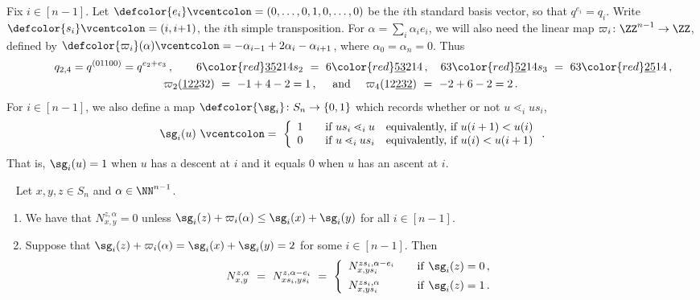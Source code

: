 Fix $i\in[n{-}1]$.
Let $\defcolor{e_i}\vcentcolon=(0,\dotsc,0,1,0,\dotsc,0)$ be the $i$th standard basis vector, so that $q^{e_i}=q_i$.
Write $\defcolor{s_i}\vcentcolon=(i,i{+}1)$, the $i$th simple transposition.
For $\alpha=\sum_i \alpha_ie_i$, we will also need the linear map $\varpi_i\colon\ZZ^{n-1}\to\ZZ$, defined by
$\defcolor{\varpi_i}(\alpha)\vcentcolon=-\alpha_{i-1}+2\alpha_i-\alpha_{i+1}$, where $\alpha_0=\alpha_n=0$.   
Thus
 \begin{multline*}
   \qquad  q_{2,4}=q^{(01100)}=q^{e_2+e_3}\,,   \qquad
   6{\color{red}\underline{35}}214 s_2\ =\ 6{\color{red}\underline{53}}214\,,\quad
   63{\color{red}\underline{52}}14 s_3\ =\ 63{\color{red}\underline{25}}14\,, \\
   \varpi_2(\underline{122}32)\ =\ -1+4-2=1\,,\quad \mbox{ and }\quad  \varpi_4(12\underline{232})\ =\ -2+6-2=2\,.\qquad 
 \end{multline*}
 For $i\in[n{-}1]$, we also define a map $\defcolor{\sg_i}\colon S_n\to\{0,1\}$ which records whether or not $u\lessdot_i
 us_i$, 
 \[
    \sg_i(u)\ \vcentcolon=\ \left\{ \begin{array}{rcl}
       1& &\mbox{if\ } u s_i\lessdot_i  u     \quad\mbox{equivalently, if\ } u(i+1)<u(i)
      \\
       0& &\mbox{if\ } u    \lessdot_i  u s_i \quad\mbox{equivalently, if\ } u(i)<u(i+1)
    \end{array}\right. .
 \]                 
 That is, $\sg_i(u)=1$ when $u$ has a descent at $i$ and it equals $0$ when $u$ has an ascent at $i$. 
  
\begin{proposition}~\cite[Theorem 1.1]{LeungLi2012}\label{P:LL_Th1.1}
  Let $x,y,z\in S_n$ and $\alpha\in\NN^{n-1}$. 
  \begin{enumerate}
    \item We have that $N^{z, \alpha}_{x,y}=0$ unless
           $\sg_i(z)+\varpi_i(\alpha) \leq \sg_i(x)+\sg_i(y)$ for all $i\in[n{-}1]$.\vspace{2pt}
           
    \item Suppose that   $\sg_i(z)+\varpi_i(\alpha) = \sg_i(x)+\sg_i(y)=2$ for some $i\in[n{-}1]$. Then
  \[
           N^{z,\alpha}_{x,y}\ =\ N^{z,\alpha-e_i}_{x s_i, y s_i}\ =\ \left\{ \begin{array}{lcl}
                 N^{z s_i, \alpha-e_i}_{x, ys_i}& &\mbox{if\/\ } \sg_i(z)=0\vspace{5pt}\,,\\
                 N^{z s_i, \alpha}_{x, ys_i}&  &\mbox{if\/\ } \sg_i(z)=1\,.\end{array}\right. 
 \]
 \end{enumerate}
\end{proposition}


